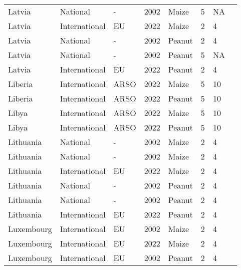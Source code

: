 \begin{landscape}
\begin{longtable}[c]{llllllll}
Latvia            & National      & -        & 2002 & Maize  & 5  & NA & \citet{van2004worldwide}     \\
Latvia            & International & EU       & 2022 & Maize  & 2  & 4  & \citet{EC2010}               \\
Latvia            & National      & -        & 2002 & Peanut & 2  & 4  & \citet{van2004worldwide}     \\
Latvia            & National      & -        & 2002 & Peanut & 5  & NA & \citet{van2004worldwide}     \\
Latvia            & International & EU       & 2022 & Peanut & 2  & 4  & \citet{EC2010}               \\
Liberia           & International & ARSO     & 2022 & Maize  & 5  & 10 & \citet{ARSO2022}             \\
Liberia           & International & ARSO     & 2022 & Peanut & 5  & 10 & \citet{ARSO2022}             \\
Libya             & International & ARSO     & 2022 & Maize  & 5  & 10 & \citet{ARSO2022}             \\
Libya             & International & ARSO     & 2022 & Peanut & 5  & 10 & \citet{ARSO2022}             \\
Lithuania         & National      & -        & 2002 & Maize  & 2  & 4  & \citet{van2004worldwide}     \\
Lithuania         & National      & -        & 2002 & Maize  & 2  & 4  & \citet{van2004worldwide}     \\
Lithuania         & International & EU       & 2022 & Maize  & 2  & 4  & \citet{EC2010}               \\
Lithuania         & National      & -        & 2002 & Peanut & 2  & 4  & \citet{van2004worldwide}     \\
Lithuania         & National      & -        & 2002 & Peanut & 2  & 4  & \citet{van2004worldwide}     \\
Lithuania         & International & EU       & 2022 & Peanut & 2  & 4  & \citet{EC2010}               \\
Luxembourg        & International & EU       & 2002 & Maize  & 2  & 4  & \citet{EC2010}               \\
Luxembourg        & International & EU       & 2022 & Maize  & 2  & 4  & \citet{EC2010}               \\
Luxembourg        & International & EU       & 2002 & Peanut & 2  & 4  & \citet{EC2010}               \\

\end{longtable}
\end{landscape}
